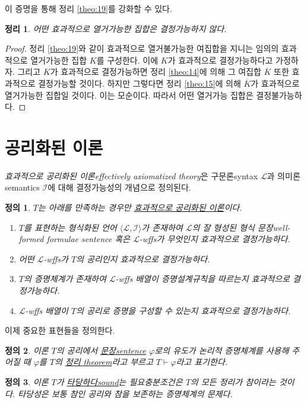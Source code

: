 \documentclass[a4paper,chapter,atbegshi]{oblivoir}
\newtheorem{defn}{정의}[chapter]
\newtheorem{theo}{정리}[chapter]
\begin{document}
이 증명을 통해 정리 \ref{theo:19}를 강화할 수 있다.
\begin{theo}
  어떤 효과적으로 열거가능한 집합은 결정가능하지 않다.
\end{theo}
\begin{proof}
  정리 \ref{theo:19}와 같이 효과적으로 열거불가능한 여집합을 지니는 임의의
  효과적으로 열거가능한 집합 $K$를 구성한다. 이에 $K$가 효과적으로 결정가능하다고
  가정하자. 그리고 $K$가 효과적으로 결정가능하면 정리 \ref{theo:14}에 의해
  그 여집합 $\overline{K}$ 또한 효과적으로 결정가능할 것이다. 하지만 그렇다면
  정리 \ref{theo:15}에 의해 $\overline{K}$가 효과적으로 열거가능한 집합일 것이다.
  이는 모순이다. 따라서 어떤 열거가능 집합은 결정불가능하다.
\end{proof}
\section{공리화된 이론}
\emph{효과적으로 공리화된 이론\tiny effectively axiomatized theory}은 
구문론{\tiny syntax} $\mathcal{L}$과 의미론{\tiny semantics} $\mathcal{I}$에 대해
결정가능성의 개념으로 정의된다.
\begin{defn}\label{defn:15}
  $T$는 아래를 만족하는 경우만
  \underline{효과적으로 공리화된 이론}이다.
  \begin{enumerate}
    \item $T$를 표현하는 형식화된 언어 $\langle\mathcal{L},\mathcal{I}
      \rangle$가 존재하여 $\mathcal{L}$의 잘 형성된 형식 문장{\tiny well-formed
      formulae sentence} 혹은 $\mathcal{L}$-wffs가 무엇인지 효과적으로 
      결정가능하다.
    \item 어떤 $\mathcal{L}$-wffs가 $T$의 공리인지 효과적으로 결정가능하다. 
    \item $T$의 증명체계가 존재하여 $\mathcal{L}$-wffs 배열이 증명설계규칙을
      따르는지 효과적으로 결정가능하다.
    \item $\mathcal{L}$-wffs 배열이 $T$의 공리로 증명을 구성할 수 있는지
      효과적으로 결정가능하다.
  \end{enumerate}
\end{defn}
이제 중요한 표현들을 정의한다. 
\begin{defn}\label{defn:16}
  이론 $T$의 공리에서 \underline{문장\tiny sentence} $\varphi$로의 유도가
  논리적 증명체계를 사용해 주어질 때 $\varphi$를 $T$의 \underline{정리\tiny 
  theorem}라고 부르고 $T\vdash\varphi$라고 표기한다. 
\end{defn}
\begin{defn}\label{defn:17}
  이론 $T$가 \underline{타당하다\tiny sound}는 필요충분조건은 $T$의 모든 정리가
  참이라는 것이다. 타당성은 보통 참인 공리와 참을 보존하는 증명체계의 문제다.
\end{defn}
\end{document}
